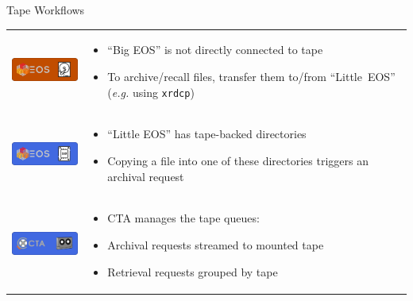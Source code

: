 \documentclass{beamer}
\begin{document}
\begin{frame}{Tape Workflows}{}
   {\small
   \begin{tabularx}{\textwidth}{p{3cm}>{\raggedright\arraybackslash}X}
      \vspace{-2cm}\includegraphics[width=3cm]{images/Big_EOS} & \parbox[b]{\linewidth}{\begin{itemize}
         \item ``Big EOS'' is not directly connected to tape
         \item To archive/recall files, transfer them to/from \mbox{``Little EOS''} (\textit{e.g.} using \texttt{xrdcp})
      \end{itemize}}\\
      \vspace{-2cm}\includegraphics[width=3cm]{images/Little_EOS} & \parbox[b]{\linewidth}{\begin{itemize}
         \item ``Little EOS'' has tape-backed directories
         \item Copying a file into one of these directories triggers an archival request
      \end{itemize}}\\
      \vspace{-1.95cm}\includegraphics[width=3cm]{images/CTA} & \parbox[b]{\linewidth}{\begin{itemize}
         \item CTA manages the tape queues:
         \item Archival requests streamed to mounted tape
         \item Retrieval requests grouped by tape
      \end{itemize}}\\
   \end{tabularx}
   }
\end{frame}
\end{document}
